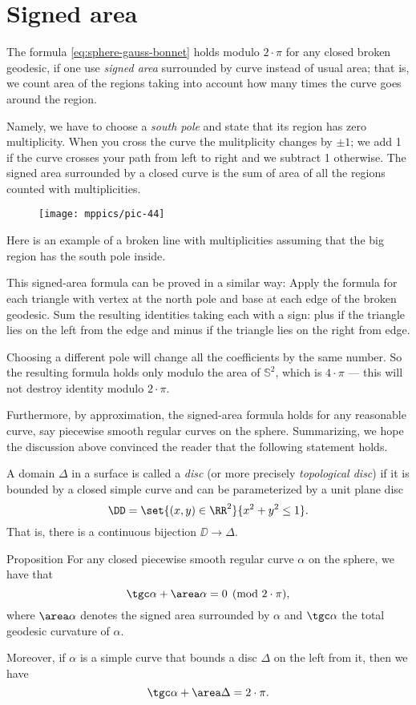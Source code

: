 \section*{Signed area}
The formula \ref{eq:sphere-gauss-bonnet} holds modulo $2\cdot \pi$ for any closed broken geodesic, if one use \emph{signed area} surrounded by curve instead of usual area;
that is, we count area of the regions taking into account how many times the curve goes around the region.

Namely, we have to choose a {}\emph{south pole} and state that its region has zero multiplicity.
When you cross the curve the mulitplicity changes by $\pm1$; we add 1 if the curve crosses your path from left to right and we subtract 1 otherwise.
The signed area surrounded by a closed curve is the sum of area of all the regions counted with multiplicities.

\begin{wrapfigure}{o}{32 mm}
\vskip-0mm
\centering
\texttt{[image: mppics/pic-44]}
\vskip-0mm
\end{wrapfigure}

Here is an example of a broken line with multiplicities assuming that the big region has the south pole inside.

This signed-area formula can be proved in a similar way:
Apply the formula for each triangle with vertex at the north pole and base at each edge of the broken geodesic.
Sum the resulting identities taking each with a sign: plus if the triangle lies on the left from the edge and minus if the triangle lies on the right from edge.

Choosing a different pole will change all the coefficients by the same number.
So the resulting formula holds only modulo the area of $\mathbb{S}^2$, which is $4\cdot \pi$ --- this will not destroy identity modulo $2\cdot\pi$.

Furthermore, by approximation, the signed-area formula holds for any reasonable curve, say piecewise smooth regular curves on the sphere.
Summarizing, we hope the discussion above convinced the reader that the following statement holds.

A domain $\Delta$ in a surface is called a \emph{disc} (or more precisely \emph{topological disc}) if it is bounded by a closed simple curve and can be parameterized by a unit plane disc 
\[\DD=\set{(x,y)\in\RR^2}{x^2+y^2\le1}.\]
That is, there is a continuous bijection $\DD\to\Delta$.

\begin{thm}{Proposition}\label{prop:spherical-gb}
For any closed piecewise smooth regular curve $\alpha$ on the sphere, 
we have that 
\[\tgc\alpha+\area\alpha=0 \pmod{2\cdot\pi},\]
where $\area\alpha$ denotes the signed area surrounded by $\alpha$ and $\tgc\alpha$ the total geodesic curvature of $\alpha$.

Moreover, if $\alpha$ is a simple curve that bounds a disc $\Delta$ on the left from it, then we have 
\[\tgc\alpha+\area\Delta=2\cdot\pi.\]

\end{thm}





